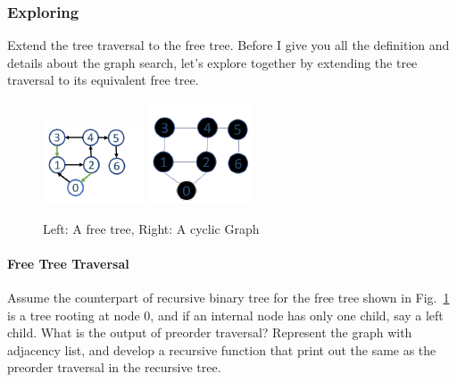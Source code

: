 \documentclass[main.tex]{subfiles}
\begin{document}
\subsubsection{Exploring}
Extend the tree traversal to the free tree. Before I give you all the definition and details about the graph search, let's explore together by extending the tree traversal to its equivalent free tree. 
\begin{figure}[!ht]
    \centering
    \includegraphics[width=0.4\columnwidth]{fig/free_tree_search.png}
     \includegraphics[width=0.4\columnwidth]{fig/cyclic_graph_searching.png}
    \caption{Left: A free tree, Right: A cyclic Graph}
    \label{fig:cyclic_graph_search}
\end{figure}
\paragraph{Free Tree Traversal} Assume the counterpart of recursive binary tree for the free tree shown in Fig.~\ref{fig:cyclic_graph_search} is a tree rooting at node 0, and if an internal node has only one child, say a left child. What is the output of preorder traversal? Represent the graph with adjacency list, and develop a recursive function that print out the same as the preorder traversal in the recursive tree. 
\end{document}
